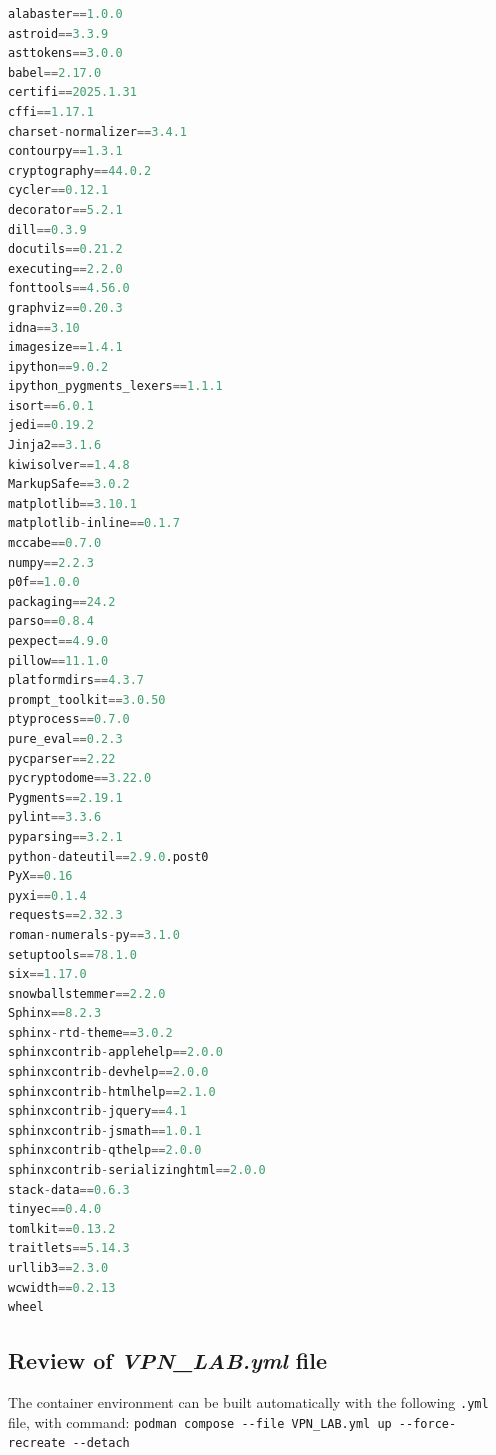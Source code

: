 \begin{lstlisting}[language=python, caption=Overview of requirements.txt]
    alabaster==1.0.0
astroid==3.3.9
asttokens==3.0.0
babel==2.17.0
certifi==2025.1.31
cffi==1.17.1
charset-normalizer==3.4.1
contourpy==1.3.1
cryptography==44.0.2
cycler==0.12.1
decorator==5.2.1
dill==0.3.9
docutils==0.21.2
executing==2.2.0
fonttools==4.56.0
graphviz==0.20.3
idna==3.10
imagesize==1.4.1
ipython==9.0.2
ipython_pygments_lexers==1.1.1
isort==6.0.1
jedi==0.19.2
Jinja2==3.1.6
kiwisolver==1.4.8
MarkupSafe==3.0.2
matplotlib==3.10.1
matplotlib-inline==0.1.7
mccabe==0.7.0
numpy==2.2.3
p0f==1.0.0
packaging==24.2
parso==0.8.4
pexpect==4.9.0
pillow==11.1.0
platformdirs==4.3.7
prompt_toolkit==3.0.50
ptyprocess==0.7.0
pure_eval==0.2.3
pycparser==2.22
pycryptodome==3.22.0
Pygments==2.19.1
pylint==3.3.6
pyparsing==3.2.1
python-dateutil==2.9.0.post0
PyX==0.16
pyxi==0.1.4
requests==2.32.3
roman-numerals-py==3.1.0
setuptools==78.1.0
six==1.17.0
snowballstemmer==2.2.0
Sphinx==8.2.3
sphinx-rtd-theme==3.0.2
sphinxcontrib-applehelp==2.0.0
sphinxcontrib-devhelp==2.0.0
sphinxcontrib-htmlhelp==2.1.0
sphinxcontrib-jquery==4.1
sphinxcontrib-jsmath==1.0.1
sphinxcontrib-qthelp==2.0.0
sphinxcontrib-serializinghtml==2.0.0
stack-data==0.6.3
tinyec==0.4.0
tomlkit==0.13.2
traitlets==5.14.3
urllib3==2.3.0
wcwidth==0.2.13
wheel

\end{lstlisting}


\subsection{Review of \textit{VPN\_LAB.yml} file}
The container environment can be built automatically with the following \lstinline{.yml} file, with command: \lstinline{podman compose --file VPN_LAB.yml up --force-recreate --detach}


